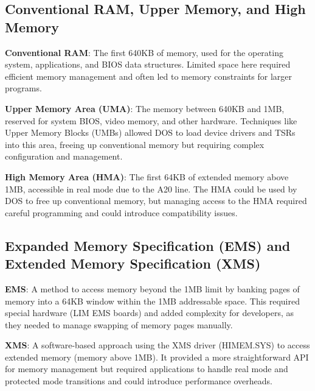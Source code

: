 \documentclass[a4paper]{article}
\begin{document}
\subsection*{Conventional RAM, Upper Memory, and High Memory}
\begin{itemize}
  \begin{item}
    \textbf{Conventional RAM}: The first 640KB of memory, used for the operating system, applications, and BIOS data structures. Limited space here required efficient memory management and often led to memory constraints for larger programs.
  \end{item}
  \begin{item}
    \textbf{Upper Memory Area (UMA)}: The memory between 640KB and 1MB, reserved for system BIOS, video memory, and other hardware. Techniques like Upper Memory Blocks (UMBs) allowed DOS to load device drivers and TSRs into this area, freeing up conventional memory but requiring complex configuration and management.
  \end{item}
  \begin{item}
    \textbf{High Memory Area (HMA)}: The first 64KB of extended memory above 1MB, accessible in real mode due to the A20 line. The HMA could be used by DOS to free up conventional memory, but managing access to the HMA required careful programming and could introduce compatibility issues.
  \end{item}
\end{itemize}
\subsection*{Expanded Memory Specification (EMS) and Extended Memory Specification (XMS)}
\begin{itemize}
  \begin{item}
    \textbf{EMS}: A method to access memory beyond the 1MB limit by banking pages of memory into a 64KB window within the 1MB addressable space. This required special hardware (LIM EMS boards) and added complexity for developers, as they needed to manage swapping of memory pages manually.
  \end{item}
  \begin{item}
    \textbf{XMS}: A software-based approach using the XMS driver (HIMEM.SYS) to access extended memory (memory above 1MB). It provided a more straightforward API for memory management but required applications to handle real mode and protected mode transitions and could introduce performance overheads.
  \end{item}
\end{itemize}
\end{document}

